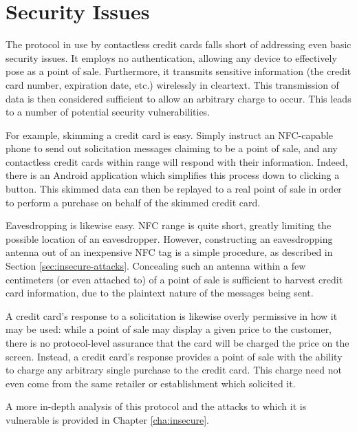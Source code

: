 \section{Security Issues}
\label{sec:intro-problem}

The protocol in use by contactless credit cards falls short of addressing even basic security issues.
It employs no authentication, allowing any device to effectively pose as a point of sale.
Furthermore, it transmits sensitive information (the credit card number, expiration date, etc.) wirelessly in cleartext.
This transmission of data is then considered sufficient to allow an arbitrary charge to occur.
This leads to a number of potential security vulnerabilities.

For example, skimming a credit card is easy.
Simply instruct an NFC-capable phone to send out solicitation messages claiming to be a point of sale, and any contactless credit cards within range will respond with their information.
Indeed, there is an Android application \cite{NFCProxy} which simplifies this process down to clicking a button.
This skimmed data can then be replayed to a real point of sale in order to perform a purchase on behalf of the skimmed credit card.

Eavesdropping is likewise easy.
NFC range is quite short, greatly limiting the possible location of an eavesdropper.
However, constructing an eavesdropping antenna out of an inexpensive NFC tag is a simple procedure, as described in Section \ref{sec:insecure-attacks}.
Concealing such an antenna within a few centimeters (or even attached to) of a point of sale is sufficient to harvest credit card information,
    due to the plaintext nature of the messages being sent.

A credit card's response to a solicitation is likewise overly permissive in how it may be used:
    while a point of sale may display a given price to the customer, there is no protocol-level assurance that the card will be charged the price on the screen.
Instead, a credit card's response provides a point of sale with the ability to charge any arbitrary single purchase to the credit card.
This charge need not even come from the same retailer or establishment which solicited it.

A more in-depth analysis of this protocol and the attacks to which it is vulnerable is provided in Chapter \ref{cha:insecure}.
